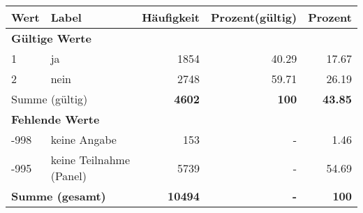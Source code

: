      \begin{longtable}{lXrrr}
     \toprule
     \textbf{Wert} & \textbf{Label} & \textbf{Häufigkeit} & \textbf{Prozent(gültig)} & \textbf{Prozent} \\
     \endhead
     \midrule
     \multicolumn{5}{l}{\textbf{Gültige Werte}}\\

     1 &
     \multicolumn{1}{X}{ ja   } &


       \num{1854} &
       \num[round-mode=places,round-precision=2]{40,29} &
         \num[round-mode=places,round-precision=2]{17,67} \\

     2 &
     \multicolumn{1}{X}{ nein   } &


       \num{2748} &
       \num[round-mode=places,round-precision=2]{59,71} &
         \num[round-mode=places,round-precision=2]{26,19} \\
     \midrule
     \multicolumn{2}{l}{Summe (gültig)} &
       \textbf{\num{4602}} &
     \textbf{100} &
       \textbf{\num[round-mode=places,round-precision=2]{43,85}} \\
     \multicolumn{5}{l}{\textbf{Fehlende Werte}}\\
       -998 &
       keine Angabe &
         \num{153} &
        - &
         \num[round-mode=places,round-precision=2]{1,46} \\
       -995 &
       keine Teilnahme (Panel) &
         \num{5739} &
        - &
         \num[round-mode=places,round-precision=2]{54,69} \\
     \midrule
     \multicolumn{2}{l}{\textbf{Summe (gesamt)}} &
          \textbf{\num{10494}} &
        \textbf{-} &
        \textbf{100} \\
     \bottomrule
     \end{longtable}
     
